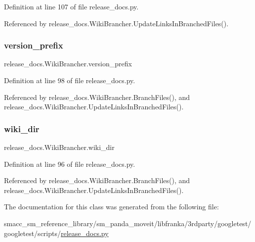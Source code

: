 Definition at line 107 of file release\+\_\+docs.\+py.



Referenced by release\+\_\+docs.\+Wiki\+Brancher.\+Update\+Links\+In\+Branched\+Files().

\mbox{\label{classrelease__docs_1_1WikiBrancher_aae330aeef850b105795c5d75727448ba}} 
\subsubsection{\texorpdfstring{version\+\_\+prefix}{version\_prefix}}
{\footnotesize\ttfamily release\+\_\+docs.\+Wiki\+Brancher.\+version\+\_\+prefix}



Definition at line 98 of file release\+\_\+docs.\+py.



Referenced by release\+\_\+docs.\+Wiki\+Brancher.\+Branch\+Files(), and release\+\_\+docs.\+Wiki\+Brancher.\+Update\+Links\+In\+Branched\+Files().

\mbox{\label{classrelease__docs_1_1WikiBrancher_ad86478c9538ac0bf3916f67eb5da2910}} 
\subsubsection{\texorpdfstring{wiki\+\_\+dir}{wiki\_dir}}
{\footnotesize\ttfamily release\+\_\+docs.\+Wiki\+Brancher.\+wiki\+\_\+dir}



Definition at line 96 of file release\+\_\+docs.\+py.



Referenced by release\+\_\+docs.\+Wiki\+Brancher.\+Branch\+Files(), and release\+\_\+docs.\+Wiki\+Brancher.\+Update\+Links\+In\+Branched\+Files().



The documentation for this class was generated from the following file\+:\begin{DoxyCompactItemize}
\item 
smacc\+\_\+sm\+\_\+reference\+\_\+library/sm\+\_\+panda\+\_\+moveit/libfranka/3rdparty/googletest/googletest/scripts/\hyperlink{release__docs_8py}{release\+\_\+docs.\+py}\end{DoxyCompactItemize}
